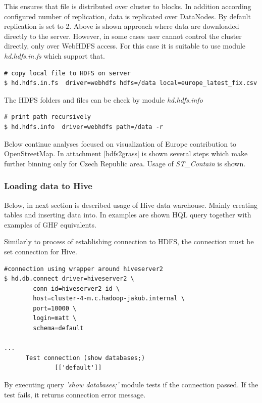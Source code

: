 \documentclass[a4paper,12pt,oneside]{report}
\begin{document}
	This ensures that file is distributed over cluster to blocks. In addition
	according  configured number of replication, data is replicated over DataNodes.
	By default replication is set to 2.
	Above is shown approach where data are downloaded directly to the server.
	However, in some cases user cannot control the cluster directly, only over
	WebHDFS access. For this case it is suitable to use module \textit{hd.hdfs.in.fs}
	which support that.
	\begin{footnotesize}
		\begin{lstlisting}[style=python]
# copy local file to HDFS on server
$ hd.hdfs.in.fs  driver=webhdfs hdfs=/data local=europe_latest_fix.csv
		\end{lstlisting}
	\end{footnotesize}
	The HDFS folders and files can be check by module \textit{hd.hdfs.info}
	\begin{footnotesize}
		\begin{lstlisting}[style=python]
# print path recursively
$ hd.hdfs.info  driver=webhdfs path=/data -r
		\end{lstlisting}
	\end{footnotesize}
	
	Below continue analyses focused on visualization of Europe contribution to OpenStreetMap. 
	In attachment \ref{hdfs2grass} is shown several steps which make further binning only for Czech
	Republic area. Usage of \textit{ST\_Contain} is shown. 
	

\subsubsection{Loading data to Hive}
	Below, in next section is described usage of Hive data warehouse. Mainly
	creating tables and inserting data into. In examples are shown HQL query
	together with examples of GHF equivalents.
	
	Similarly to process of establishing connection to HDFS,
	 the connection must be set connection for Hive.
\begin{footnotesize}
	\begin{lstlisting}[style=python]
#connection using wrapper around hiveserver2
$ hd.db.connect driver=hiveserver2 \
		conn_id=hiveserver2_id \
		host=cluster-4-m.c.hadoop-jakub.internal \
		port=10000 \
		login=matt \
		schema=default 
	 		
...
      Test connection (show databases;) 
              [['default']]
		\end{lstlisting}
	\end{footnotesize}
	By executing query \textit{'show databases;'} module tests if the connection
	passed. If the test fails, it returns connection error message.
	
\end{document}
